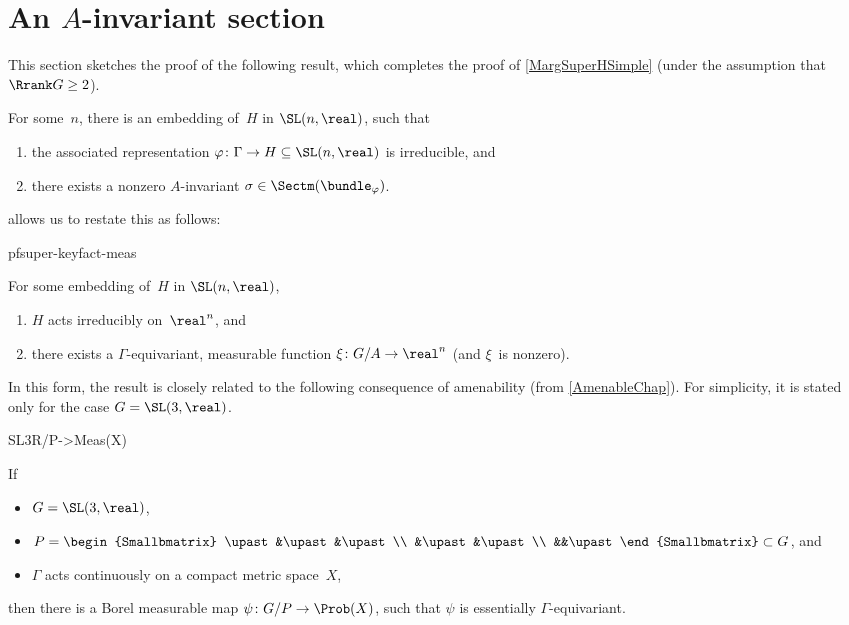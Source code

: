 \section{An \texorpdfstring{$A$}{A}-invariant section}

This section sketches the proof of the following result, which completes the proof of \cref{MargSuperHSimple} (under the assumption that $\Rrank G \ge 2$).

\begin{keyfact} \label{pfsuper-keyfact-meas}
For some~$n$, there is an embedding of~$H$ in $\SL(n,\real)$, such that%
\noprelistbreak
	\begin{enumerate}
	\item the associated representation $\varphi \colon \Gamma \to H \subseteq \SL(n,\real)$ is irreducible,
	and
	\item there exists a nonzero $A$-invariant $\sigma \in \Sectm(\bundle_\varphi)$.
	\end{enumerate}
\end{keyfact}

 allows us to restate this as follows:

\begin{thmref}{pfsuper-keyfact-meas}
\begin{keyfact} \label{pfsuper-keyfact-equi}
For some embedding of~$H$ in $\SL(n,\real)$, 
\begin{enumerate}
\item $H$ acts irreducibly on~$\real^n$, 
and
\item there exists a\/ $\Gamma$-equivariant, measurable function\/ $\xi \colon G/A \to \real^n$ \textup(and $\xi$~is nonzero\/\textup).
\end{enumerate}
\end{keyfact}
\end{thmref}

In this form, the result is closely related to the following consequence of amenability (from \cref{AmenableChap}). For simplicity, it is stated only for the case $G = \SL(3,\real)$.

\begin{thmref}{SL3R/P->Meas(X)}
\begin{prop}[(Furstenberg)] \label{SL3R/P->Meas(X)'}
If
\noprelistbreak
	\begin{itemize}
	\item $G = \SL(3,\real)$,
	\item $ P
	 =  \begin{Smallbmatrix} \upast&\upast&\upast \\ &\upast&\upast \\ &&\upast \end{Smallbmatrix}
	 \subset G $,
	 and
	 \item $\Gamma$ acts continuously on a compact metric space~$X$,
 \end{itemize}
 then there is a Borel measurable map $\psi \colon G/P \to
\Prob(X)$, such that $\psi$ is essentially
$\Gamma$-equivariant.
 \end{prop}
 \end{thmref}

